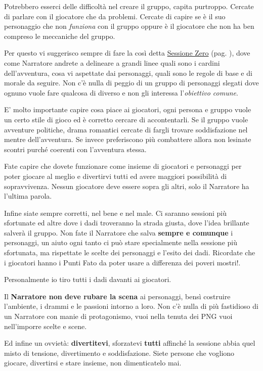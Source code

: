 \begin{multicols}{2}
{Potrebbero esserci delle difficoltà nel creare il gruppo, capita purtroppo. Cercate di parlare con il giocatore che da problemi. Cercate di capire se è il suo personaggio che non \emph{funziona} con il gruppo oppure è il giocatore che non ha ben compreso le meccaniche del gruppo.

Per questo vi suggerisco sempre di fare la così detta \hyperlink{sessionezero}{Sessione Zero} (pag. \pageref{sessionezero}), dove come Narratore andrete a delineare a grandi linee quali sono i cardini dell'avventura, cosa vi aspettate dai personaggi, quali sono le regole di base e di morale da seguire. Non c'è nulla di peggio di un gruppo di personaggi slegati dove ognuno vuole fare qualcosa di diverso e non gli interessa l'\emph{obiettivo comune}.

E' molto importante capire cosa piace ai giocatori, ogni persona e gruppo vuole un certo stile di gioco ed è corretto cercare di accontentarli. Se il gruppo vuole avventure politiche, drama romantici cercate di fargli trovare soddisfazione nel mentre dell'avventura. Se invece preferiscono più combattere allora non lesinate scontri purché coerenti con l'avventura stessa.

Fate capire che dovete funzionare come insieme di giocatori e personaggi per poter giocare al meglio e divertirvi tutti ed avere maggiori possibilità di sopravvivenza. Nessun giocatore deve essere sopra gli altri, solo il Narratore ha l'ultima parola.

Infine siate sempre corretti, nel bene e nel male. Ci saranno sessioni più sfortunate ed altre dove i dadi troveranno la strada giusta, dove l'idea brillante salverà il gruppo. Non fate il Narratore che salva \textbf{sempre e comunque} i personaggi, un aiuto ogni tanto ci può stare specialmente nella sessione più sfortunata, ma rispettate le scelte dei personaggi e l'esito dei dadi. Ricordate che i giocatori hanno i Punti Fato da poter usare a differenza dei poveri mostri!.

Personalmente io tiro tutti i dadi davanti ai giocatori.

Il \textbf{Narratore non deve rubare la scena} ai personaggi, bensì costruire l'ambiente, i drammi e le passioni intorno a loro. Non c'è nulla di più fastidioso di un Narratore con manie di protagonismo, vuoi nella tenuta dei PNG vuoi nell'imporre scelte e scene.

Ed infine un ovvietà: \textbf{divertitevi}, sforzatevi \textbf{tutti} affinché la sessione abbia quel misto di tensione, divertimento e soddisfazione. Siete persone che vogliono giocare, divertirsi e stare insieme, non dimenticatelo mai.

} %

\end{multicols}


